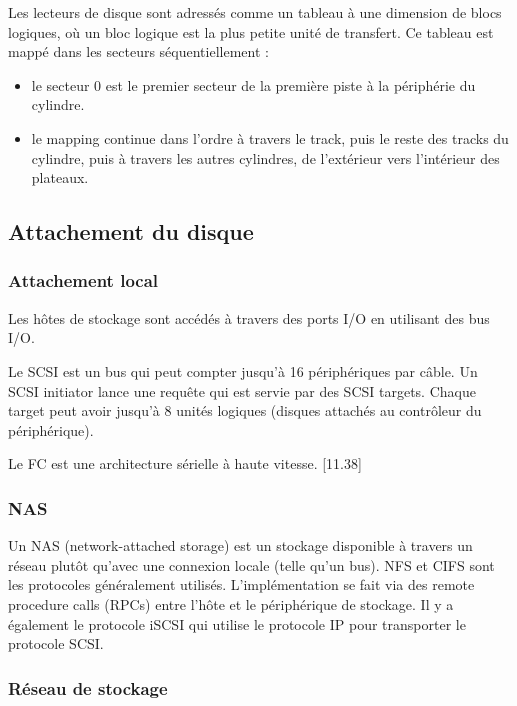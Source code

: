	Les lecteurs de disque sont adressés comme un tableau à une dimension de blocs logiques, où un bloc logique est la plus petite unité de transfert. Ce tableau est mappé dans les secteurs séquentiellement :
	
	\begin{itemize}
		\item le secteur 0 est le premier secteur de la première piste à la périphérie du cylindre.
		\item le mapping continue dans l'ordre à travers le track, puis le reste des tracks du cylindre, puis à travers les autres cylindres, de l'extérieur vers l'intérieur des plateaux.
	\end{itemize}
	
	\subsection{Attachement du disque}
	
	\subsubsection{Attachement local}
	Les hôtes de stockage sont accédés à travers des ports I/O en utilisant des bus I/O.
	
	Le SCSI est un bus qui peut compter jusqu'à 16 périphériques par câble. Un SCSI initiator lance une requête qui est servie par des SCSI targets. Chaque target peut avoir jusqu'à 8 unités logiques (disques attachés au contrôleur du périphérique).
	
	Le FC est une architecture sérielle à haute vitesse. [11.38]
	
	\subsubsection{NAS}
	
	Un NAS (network-attached storage) est un stockage disponible à travers un réseau plutôt qu'avec une connexion locale (telle qu'un bus). NFS et CIFS sont les protocoles généralement utilisés. L'implémentation se fait via des remote procedure calls (RPCs) entre l'hôte et le périphérique de stockage. Il y a également le protocole iSCSI qui utilise le protocole IP pour transporter le protocole SCSI.
	
	
	\subsubsection{Réseau de stockage}
	
